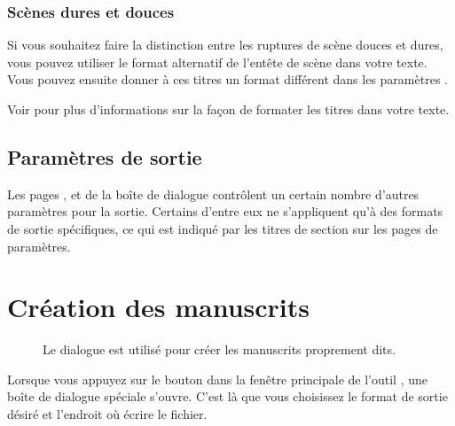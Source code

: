 \documentclass[a4paper,11pt,french]{sphinxmanual}
\begin{document}
\subsubsection{Scènes dures et douces}
\label{\detokenize{project_manuscript:hard-and-soft-scenes}}\label{\detokenize{project_manuscript:a-manuscript-settings-head-hard}}
\sphinxAtStartPar
Si vous souhaitez faire la distinction entre les ruptures de scène douces et dures, vous pouvez utiliser le format alternatif de l’en\sphinxhyphen{}tête de scène dans votre texte. Vous pouvez ensuite donner à ces titres un format différent dans les paramètres .

\sphinxAtStartPar
Voir {\hyperref[\detokenize{usage_format:a-fmt-head}]{}} pour plus d’informations sur la façon de formater les titres dans votre texte.


\subsection{Paramètres de sortie}
\label{\detokenize{project_manuscript:output-settings}}
\sphinxAtStartPar
Les pages ,  et  de la boîte de dialogue  contrôlent un certain nombre d’autres paramètres pour la sortie. Certains d’entre eux ne s’appliquent qu’à des formats de sortie spécifiques, ce qui est indiqué par les titres de section sur les pages de paramètres.


\section{Création des manuscrits}
\label{\detokenize{project_manuscript:building-manuscript-documents}}\label{\detokenize{project_manuscript:a-manuscript-build}}
\begin{figure}[htbp]
\centering
\capstart

\noindent{}
\caption{Le dialogue  est utilisé pour créer les manuscrits proprement dits.}\label{\detokenize{project_manuscript:id5}}\end{figure}

\sphinxAtStartPar
Lorsque vous appuyez sur le bouton  dans la fenêtre principale de l’outil , une boîte de dialogue spéciale s’ouvre. C’est là que vous choisissez le format de sortie désiré et l’endroit où écrire le fichier.
\end{document}
